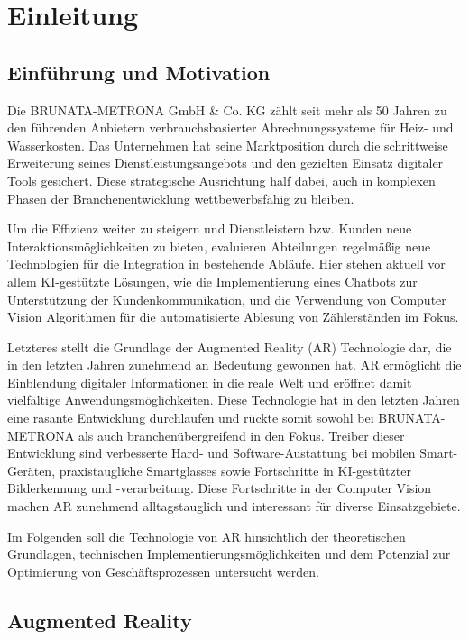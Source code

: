 \chapter{Einleitung}

\section{Einführung und Motivation}

Die BRUNATA-METRONA GmbH \& Co. KG zählt seit mehr als 50 Jahren zu den führenden Anbietern verbrauchsbasierter Abrechnungssysteme für Heiz- und Wasserkosten. Das Unternehmen hat seine Marktposition durch die schrittweise Erweiterung seines Dienstleistungsangebots und den gezielten Einsatz digitaler Tools gesichert. Diese strategische Ausrichtung half dabei, auch in komplexen Phasen der Branchenentwicklung wettbewerbsfähig zu bleiben.

Um die Effizienz weiter zu steigern und Dienstleistern bzw. Kunden neue Interaktionsmöglichkeiten zu bieten, evaluieren Abteilungen regelmäßig neue Technologien für die Integration in bestehende Abläufe. Hier stehen aktuell vor allem KI-gestützte Lösungen, wie die Implementierung eines Chatbots zur Unterstützung der Kundenkommunikation, und die Verwendung von Computer Vision Algorithmen für die automatisierte Ablesung von Zählerständen im Fokus.

Letzteres stellt die Grundlage der Augmented Reality (AR) Technologie dar, die in den letzten Jahren zunehmend an Bedeutung gewonnen hat. AR ermöglicht die Einblendung digitaler Informationen in die reale Welt und eröffnet damit vielfältige Anwendungsmöglichkeiten. Diese Technologie hat in den letzten Jahren eine rasante Entwicklung durchlaufen und rückte somit sowohl bei BRUNATA-METRONA als auch branchenübergreifend in den Fokus. Treiber dieser Entwicklung sind verbesserte Hard- und Software-Austattung bei mobilen Smart-Geräten, praxistaugliche Smartglasses sowie Fortschritte in KI-gestützter Bilderkennung und -verarbeitung. Diese Fortschritte in der Computer Vision machen AR zunehmend alltagstauglich und interessant für diverse Einsatzgebiete.

Im Folgenden soll die Technologie von AR hinsichtlich der theoretischen Grundlagen, technischen Implementierungsmöglichkeiten und dem Potenzial zur Optimierung von Geschäftsprozessen untersucht werden.

\section{Augmented Reality}

